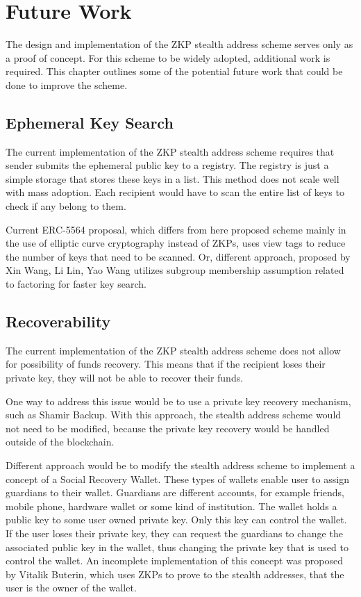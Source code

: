 \chapter{Future Work}

The design and implementation of the ZKP stealth address scheme serves only as
a proof of concept. For this scheme to be widely adopted, additional work is
required. This chapter outlines some of the potential future work that could be
done to improve the scheme.

\section{Ephemeral Key Search}

The current implementation of the ZKP stealth address scheme requires that sender
submits the ephemeral public key to a registry. The registry is just a simple
storage that stores these keys in a list. This method does not scale well with
mass adoption. Each recipient would have to scan the entire list of keys to
check if any belong to them.

Current ERC-5564\cite{ethereumERC5564Stealth} proposal, which differs from
here proposed scheme mainly in the use of elliptic curve cryptography instead
of ZKPs, uses view tags to reduce the number of keys that need to be scanned.
Or, different approach, proposed by Xin Wang, Li Lin, Yao Wang \cite{Wang2023}
utilizes subgroup membership assumption related to factoring for faster key
search.

\section{Recoverability}

The current implementation of the ZKP stealth address scheme does not allow for
possibility of funds recovery. This means that if the recipient loses their
private key, they will not be able to recover their funds.

One way to address this issue would be to use a private key recovery
mechanism, such as Shamir Backup. With this approach, the stealth address
scheme would not need to be modified, because the private key recovery would
be handled outside of the blockchain.

Different approach would be to modify the stealth address scheme to implement
a concept of a Social Recovery Wallet. These types of wallets enable user to
assign guardians to their wallet. Guardians are different accounts, for example
friends, mobile phone, hardware wallet or some kind of institution. The wallet
holds a public key to some user owned private key. Only this key can control
the wallet. If the user loses their private key, they can request the
guardians to change the associated public key in the wallet, thus changing the
private key that is used to control the wallet\cite{ButerinSocialRecovery}.
An incomplete implementation of this concept was proposed by Vitalik Buterin\cite{ButerinIncompleteGuide},
which uses ZKPs to prove to the stealth addresses, that the user is the owner
of the wallet.


